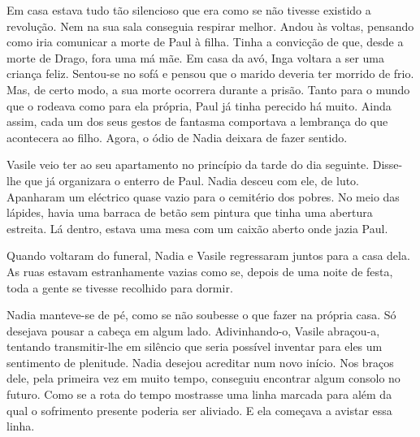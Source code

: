 Em casa estava tudo tão silencioso que era como se não tivesse existido
a revolução. Nem na sua sala conseguia respirar melhor. Andou às voltas,
pensando como iria comunicar a morte de Paul à filha. Tinha a convicção
de que, desde a morte de Drago, fora uma má mãe. Em casa da avó, Inga
voltara a ser uma criança feliz. Sentou-se no sofá e pensou que o marido
deveria ter morrido de frio. Mas, de certo modo, a sua morte ocorrera
durante a prisão. Tanto para o mundo que o rodeava como para ela
própria, Paul já tinha perecido há muito. Ainda assim, cada um dos seus
gestos de fantasma comportava a lembrança do que acontecera ao filho.
Agora, o ódio de Nadia deixara de fazer sentido.

Vasile veio ter ao seu apartamento no princípio da tarde
do dia seguinte. Disse-lhe que já organizara o enterro de Paul. Nadia
desceu com ele, de luto. Apanharam um eléctrico quase vazio para o
cemitério dos pobres. No meio das lápides, havia uma barraca de betão
sem pintura que tinha uma abertura estreita. Lá dentro, estava uma mesa
com um caixão aberto onde jazia Paul.

Quando voltaram do funeral, Nadia e Vasile regressaram juntos para a
casa dela. As ruas estavam estranhamente vazias como se, depois de uma noite de festa, toda a gente se
tivesse recolhido para dormir.

Nadia manteve-se de pé, como se não soubesse o que fazer na própria
casa. Só desejava pousar a cabeça em algum lado. Adivinhando-o, Vasile
abraçou-a, tentando transmitir-lhe em silêncio que seria possível
inventar para eles um sentimento de plenitude. Nadia desejou acreditar
num novo início. Nos braços dele, pela primeira vez em muito tempo,
conseguiu encontrar algum consolo no futuro. Como se a rota do tempo
mostrasse uma linha marcada para além da qual o sofrimento presente
poderia ser aliviado. E ela começava a avistar essa linha.
